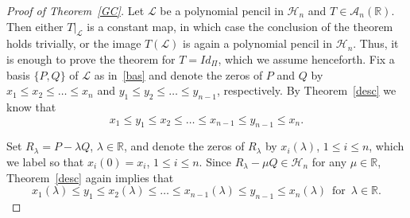 \documentclass[10pt,twoside,a4paper,reqno]{amsart}
\theoremstyle{plain}
\theoremstyle{definition}
\theoremstyle{remark}
\newcommand {\bR} {\mathbb {R}}
\newcommand {\la} {\lambda}
\newcommand {\calL} {\mathcal {L}}
\newcommand {\calH} {\mathcal {H}}
\newcommand {\calA} {\mathcal {A}}
\newcommand {\vP} {\varPi}
\begin{document}
\begin{proof}[Proof of Theorem~\ref{GC}]
Let $\calL$ be a polynomial pencil 
in $\calH_n$ and $T\in \calA_n(\bR)$. Then either $T|_{\calL}$ is a constant 
map, in which case the conclusion of the theorem holds trivially, or the image 
$T(\calL)$ is again a polynomial pencil in $\calH_n$. Thus, it is enough to 
prove the theorem for $T=Id_{\vP}$, which we assume henceforth. Fix a basis 
$\{P,Q\}$ of $\calL$ as in~\eqref{bas} and denote 
the zeros of $P$ and $Q$ by $x_{1}\le x_{2} \le\ldots \le x_{n}$ and 
$y_{1}\le y_{2} \le \ldots \le y_{n-1}$, respectively. By Theorem~\ref{desc} 
we know that
\begin{equation}\label{interl1}
x_{1}\le y_1\le x_{2} \le\ldots \le x_{n-1}\le y_{n-1}\le x_n.
\end{equation}

Set $R_{\la}=P-\la Q$, $\la\in \bR$, and denote the zeros of $R_{\la}$ by 
$x_{i}(\la)$, $1\le i\le n$, which we label so that 
$x_{i}(0)=x_i$, $1\le i\le n$. Since $R_{\la}-\mu Q\in \calH_n$ for any 
$\mu\in \bR$, Theorem~\ref{desc} again implies that 
\begin{equation}\label{interl2}
x_{1}(\la)\le y_1\le x_{2}(\la) \le\ldots \le x_{n-1}(\la)\le y_{n-1}\le 
x_n(\la)\,\text{ for }\,\la\in \bR.
\end{equation}


\end{proof}
\end{document}
